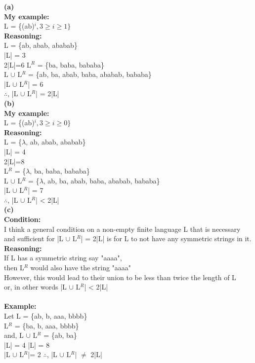 \documentclass{homework}
\begin{document}
\maketitle

\question

\textbf{(a)}\\
\textbf{My example:}\\
L = \{(ab)$^i, 3\geq i\geq1\}$\\
\newline
\textbf{Reasoning:}\\
L = \{ab, abab, ababab\}\\
|L| = 3\\
2|L|=6
L$^R$ = \{ba, baba, bababa\}\\
L $\cup $ L$^R$ = \{ab, ba, abab, baba, ababab, bababa\}\\
|L $\cup $ L$^R$| = 6\\
$\therefore$, |L $\cup $ L$^R$| = 2|L|\\

\textbf{(b)}\\
\textbf{My example:}\\
L = \{(ab)$^i, 3\geq i\geq0\}$\\
\newline
\textbf{Reasoning:}\\
L = \{$\lambda$, ab, abab, ababab\}\\
|L| = 4\\
2|L|=8\\
L$^R$ = \{$\lambda$, ba, baba, bababa\}\\
L $\cup $ L$^R$ = \{$\lambda$, ab, ba, abab, baba, ababab, bababa\}\\
|L $\cup $ L$^R$| = 7\\
$\therefore$, |L $\cup $ L$^R$| < 2|L|\\

\textbf{(c)}\\
\textbf{Condition:}\\
I think a general condition on a non-empty finite language L that is necessary and sufficient for |L $\cup $ L$^R$| = 2|L| is for L to not have any symmetric strings in it.\\

\textbf{Reasoning:}\\
If L has a symmetric string say "aaaa",\\
then L$^R$ would also have the string "aaaa"\\
However, this would lead to their union to be less than twice the length of L\\
or, in other words |L $\cup $ L$^R$| < 2|L|\\
\\
\textbf{Example:}\\
Let L = \{ab, b, aaa, bbbb\}\\
L$^R$ = \{ba, b, aaa, bbbb\}\\
and, L $\cup $ L$^R$ = \{ab, ba\}\\
|L| = 4 |L| = 8\\
|L $\cup $ L$^R$|= 2
$\therefore$, |L $\cup $ L$^R$| $\neq$ 2|L|\\
\end{document}
